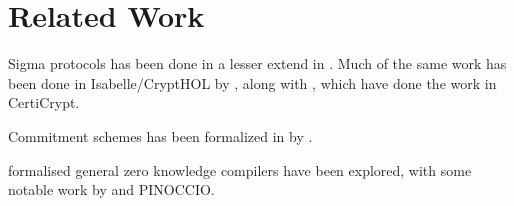 \chapter{Related Work}
\label{ch:related_work}

Sigma protocols has been done in a lesser extend in \easycrypt. Much of the same
work has been done in Isabelle/CryptHOL by \citeauthor{cryptoeprint:2019:1185},
along with \citeauthor{certicrypt_sigma}, which have done the work in
CertiCrypt.


Commitment schemes has been formalized in \easycrypt by
\citeauthor{DBLP:journals/corr/MetereD17}.


formalised general zero knowledge compilers have been explored, with some
notable work by \citeauthor{zkcrypt} and PINOCCIO.



